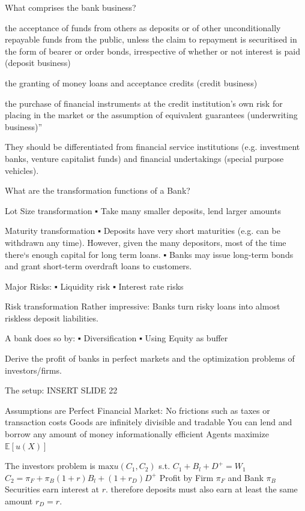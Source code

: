 What comprises the bank business?

the acceptance of funds from others as deposits or of other
unconditionally repayable funds from the public, unless the
claim to repayment is securitised in the form of bearer or
order bonds, irrespective of whether or not interest is paid
(deposit business)

the granting of money loans and acceptance credits (credit
business)

the purchase of financial instruments at the credit
institution's own risk for placing in the market or the
assumption of equivalent guarantees (underwriting
business)”

They should be differentiated from financial service institutions
(e.g. investment banks, venture capitalist funds) and 
financial undertakings (special purpose vehicles).


What are the transformation functions of a Bank?

Lot Size transformation
▪ Take many smaller deposits, lend larger amounts

Maturity transformation
▪ Deposits have very short maturities (e.g. can be withdrawn any time). 
However, given the many depositors, most of the time there‘s enough capital 
for long term loans.
▪ Banks may issue long-term bonds and grant short-term overdraft loans to customers.

Major Risks:
▪ Liquidity risk
▪ Interest rate risks

Risk transformation
Rather impressive: Banks turn risky loans into almost
riskless deposit liabilities.

A bank does so by:
▪ Diversification
▪ Using Equity as buffer


Derive the profit of banks in perfect markets
and the optimization problems of investors/firms.

The setup:
INSERT SLIDE 22

Assumptions are
Perfect Financial Market:
No frictions such as taxes or transaction costs
Goods are infinitely divisible and tradable
You can lend and borrow any amount of money
informationally efficient
Agents maximize \( \mathbb{E}[u(X)] \)

The investors problem is
\( \text{max} u(C_1, C_2) \)
s.t. 
\( C_1 + B_l + D^{+} = W_1 \)
\( C_2 = \pi_F + \pi_B (1 + r)B_l + (1 + r_D)D^{+} \)
Profit by Firm \( \pi_F \) and Bank \( \pi_B \) 
Securities earn interest at \( r \).
therefore deposits must also earn at least the same amount \( r_D = r \).

